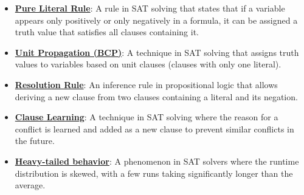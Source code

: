 \documentclass{article}%
\begin{document}
\begin{itemize}[leftmargin=*]
\item \href{https://purdue.brightspace.com/d2l/common/assets/pdfjs-d2l-dist/1.0.14-legacy/web/viewer.html?file=%2Fcontent%2Fenforced%2F1095467-wl.202510.CS.24300.001%2F15L2-SAT.pdf%3Fou%3D1095467&lang=en-us&container=d2l-fileviewer-rendered-pdf&fullscreen=d2l-fileviewer-rendered-pdf-dialog&height=667#page=19}{\textbf{Pure Literal Rule}}: A rule in SAT solving that states that if a variable appears only positively or only negatively in a formula, it can be assigned a truth value that satisfies all clauses containing it.%
\item \href{https://purdue.brightspace.com/d2l/common/assets/pdfjs-d2l-dist/1.0.14-legacy/web/viewer.html?file=%2Fcontent%2Fenforced%2F1095467-wl.202510.CS.24300.001%2F15L2-SAT.pdf%3Fou%3D1095467&lang=en-us&container=d2l-fileviewer-rendered-pdf&fullscreen=d2l-fileviewer-rendered-pdf-dialog&height=667#page=20}{\textbf{Unit Propagation (BCP)}}: A technique in SAT solving that assigns truth values to variables based on unit clauses (clauses with only one literal).%
\item \href{https://purdue.brightspace.com/d2l/common/assets/pdfjs-d2l-dist/1.0.14-legacy/web/viewer.html?file=%2Fcontent%2Fenforced%2F1095467-wl.202510.CS.24300.001%2F15L2-SAT.pdf%3Fou%3D1095467&lang=en-us&container=d2l-fileviewer-rendered-pdf&fullscreen=d2l-fileviewer-rendered-pdf-dialog&height=667#page=32}{\textbf{Resolution Rule}}: An inference rule in propositional logic that allows deriving a new clause from two clauses containing a literal and its negation.%
\item \href{https://purdue.brightspace.com/d2l/common/assets/pdfjs-d2l-dist/1.0.14-legacy/web/viewer.html?file=%2Fcontent%2Fenforced%2F1095467-wl.202510.CS.24300.001%2F15L2-SAT.pdf%3Fou%3D1095467&lang=en-us&container=d2l-fileviewer-rendered-pdf&fullscreen=d2l-fileviewer-rendered-pdf-dialog&height=667#page=34}{\textbf{Clause Learning}}: A technique in SAT solving where the reason for a conflict is learned and added as a new clause to prevent similar conflicts in the future.%
\item \href{https://purdue.brightspace.com/d2l/common/assets/pdfjs-d2l-dist/1.0.14-legacy/web/viewer.html?file=%2Fcontent%2Fenforced%2F1095467-wl.202510.CS.24300.001%2F15L2-SAT.pdf%3Fou%3D1095467&lang=en-us&container=d2l-fileviewer-rendered-pdf&fullscreen=d2l-fileviewer-rendered-pdf-dialog&height=667#page=35}{\textbf{Heavy-tailed behavior}}: A phenomenon in SAT solvers where the runtime distribution is skewed, with a few runs taking significantly longer than the average.%

\end{itemize}
\end{document}
